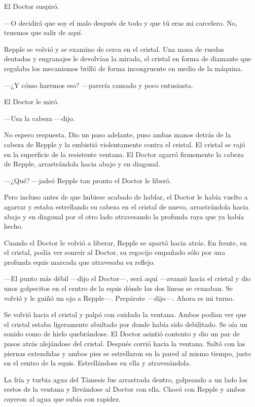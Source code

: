 {El Doctor suspiró.}

{---O decidirá que soy el malo después de todo y que tú eras mi
carcelero. No, tenemos que salir de aquí.}

{Repple se volvió y se examino de cerca en el cristal. Una masa de
	ruedas dentadas y engranajes le devolvían la mirada, el cristal en forma
	de diamante que regulaba los mecanismos brilló de forma incongruente en
medio de la máquina.}

{---¿Y cómo haremos eso? ---parecía cansado y poco entusiasta.}

{El Doctor le miró.}

{---Usa la cabeza ---dijo.}

{No espero respuesta. Dio un paso adelante, puso ambas manos detrás de
	la cabeza de Repple y la embistió violentamente contra el cristal. El
	cristal se rajó en la superficie de la resistente ventana. El Doctor
	agarró firmemente la cabeza de Repple, arrastrándola hacia abajo y en
diagonal.}

{---¿Qué? ---jadeó Repple tan pronto el Doctor le liberó.}

{Pero incluso antes de que hubiese acabado de hablar, el Doctor le había
	vuelto a agarrar y estaba estrellando su cabeza en el cristal de nuevo,
	arrastrándola hacia abajo y en diagonal por el otro lado atravesando la
profunda raya que ya había hecho.}

{Cuando el Doctor le volvió a liberar, Repple se apartó hacia atrás. En
	frente, en el cristal, podía ver sonreír al Doctor, su regocijo empañado
sólo por una profunda equis marcada que atravesaba su reflejo.}

{---El punto más débil ---dijo el Doctor---, será aquí ---avanzó hacia
	el cristal y dio unos golpecitos en el centro de la equis dónde las dos
	líneas se cruzaban. Se volvió y le guiñó un ojo a Repple---. Prepárate
---dijo---. Ahora es mi turno.}

{Se volvió hacia el cristal y palpó con cuidado la ventana. Ambos podían
	ver que el cristal estaba ligeramente abultado por donde había sido
	debilitado. Se oía un sonido como de hielo quebrándose. El Doctor
	asintió contento y dio un par de pasos atrás alejándose del cristal.
	Después corrió hacia la ventana. Saltó con las piernas extendidas y
	ambos pies se estrellaron en la pared al mismo tiempo, justo en el
centro de la equis. Estrellándose en ella y atravesándola.}

{La fría y turbia agua del Támesis fue arrastrada dentro, golpeando a un
	lado los restos de la ventana y llevándose al Doctor con ella. Chocó con
Repple y ambos cayeron al agua que subía con rapidez.}

